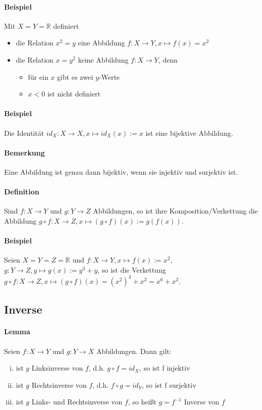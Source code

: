 \documentclass[12pt,a4paper,parskip=half-,DIV=15]{scrartcl}
\begin{document}
\paragraph{Beispiel} Mit $X=Y=\mathbb{R}$ definiert
\begin{itemize}
\item die Relation $x^2 = y$ eine Abbildung $f:X\to Y, x\mapsto f(x)=x^2$
\item die Relation $x=y^2$ keine Abbildung $f:X\to Y$, denn
	\begin{itemize}
	\item für ein $x$ gibt es zwei $y$-Werte
	\item $x < 0$ ist nicht definiert
	\end{itemize}
\end{itemize}

\paragraph{Beispiel} Die Identität $id_X :X\to X, x\mapsto id_X(x):= x$ ist eine bijektive Abbildung.
\paragraph{Bemerkung} Eine Abbildung ist genau dann bijektiv, wenn sie injektiv und surjektiv ist.
\paragraph{Definition} Sind $ f:X\to Y $ und $ g:Y\to Z$ Abbildungen, so ist ihre Komposition/Verkettung die Abbildung $ g\circ f:X\to Z, x\mapsto (g\circ f)(x):= g(f(x)) $.
\paragraph{Beispiel} Seien $ X = Y = Z = \mathbb{R} $ und $ f:X\to Y, x\mapsto f(x) :=x^2 $, $ g:Y\to Z, y\mapsto g(x):=y^3 + y $, so ist die Verkettung $ g\circ f: X\to Z, x\mapsto (g\circ f)(x) = (x^2)^3+x^2 = x^6 + x^2 $.

\subsection{Inverse}
\paragraph{Lemma} Seien $ f:X\to Y $ und $ g:Y\to X $ Abbildungen. Dann gilt:
\begin{enumerate}[i)]
\item ist $ g $ Linksinverse von $ f $, d.h. $ g\circ f = id_X $, so ist f injektiv
\item ist $ g $ Rechtsinverse von $ f $, d.h. $ f\circ g = id_Y$, so ist f surjektiv
\item ist $ g $ Links- und Rechtsinverse von $ f $, so heißt $ g =f^{-1}$ Inverse von $ f $
\end{enumerate}
\end{document}
